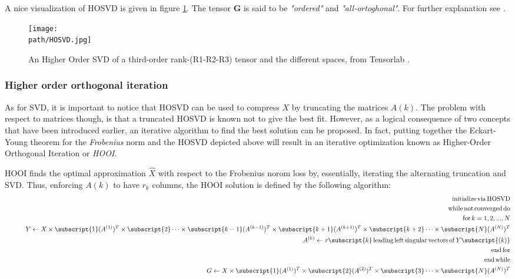 A nice visualization of HOSVD is given in figure \ref{fig:hosvd}. The tensor $\mathbf{G}$ is said to be \emph{"ordered"} and \emph{"all-ortoghonal"}. For further explanation see \parencite{multilinear}. 

\begin{figure}[h!]
 \centering
 \texttt{[image: \\path/HOSVD.jpg]} 
 \caption{An Higher Order SVD of a third-order rank-(R1-R2-R3) tensor and the different spaces, from Tensorlab \parencite{WTensorlab}.}
 \label{fig:hosvd}
\end{figure}

\subsubsection{Higher order orthogonal iteration}
As for SVD, it is important to notice that HOSVD can be used to compress $X$ by truncating the matrices $A(k)$. The problem with respect to matrices though, is that a truncated HOSVD is known not to give the best fit. However, as a logical consequence of two concepts that have been introduced earlier, an iterative algorithm to find the best solution can be proposed.
\newline
In fact, putting together the Eckart-Young theorem for the \emph{Frobenius} norm and the HOSVD depicted above will result in an iterative optimization known as Higher-Order Orthogonal Iteration or \emph{HOOI}. 
\newline

HOOI finds the optimal approximation $\hat{X}$ with respect to the Frobenius norom loss by, essentially, iterating the alternating truncation and SVD. Thus, enforcing $A(k)$ to have $r_k$ columns, the HOOI solution is defined by the following algorithm: 
\begin{eqnarray}
&\,&\mathrm{initialize\,via\,HOSVD} \nonumber\\
&\,&\mathrm{while\,not\,converged\,do} \nonumber\\
&\,&\quad \mathrm{for}\, k = 1, 2, ..., N \nonumber\\
&\,&\quad\quad Y \leftarrow X \times\subscript{1} (A^{(1)})^T \times\subscript{2} \cdots \times\subscript{k-1} (A^{(k-1)})^T \times\subscript{k+1} (A^{(k+1)})^T \times\subscript{k+2} \cdots \times\subscript{N} (A^{(N)})^T  \nonumber\\
&\,&\quad\quad A^{(k)} \leftarrow r\subscript{k}\,\mathrm{leading\,left\,singular\,vectors\,of}\,Y\subscript{(k)} \nonumber\\
&\,&\quad \mathrm{end\,for} \nonumber\\
&\,&\mathrm{end\,while} \nonumber\\
&\,&G \leftarrow X \times\subscript{1} (A^{(1)})^T \times\subscript{2} (A^{(2)})^T \times\subscript{3} \cdots \times\subscript{N} (A^{(N)})^T  \nonumber\\
\end{eqnarray}



